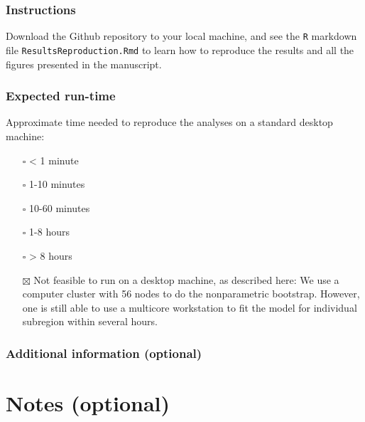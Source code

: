 \documentclass[
]{article}
\providecommand{\tightlist}{%
  \setlength{\itemsep}{0pt}\setlength{\parskip}{0pt}}
\begin{document}
\subsubsection{Instructions}\label{instructions}

Download the Github repository to your local machine, and see the
\texttt{R} markdown file \texttt{ResultsReproduction.Rmd} to learn how
to reproduce the results and all the figures presented in the
manuscript.

\subsubsection{Expected run-time}\label{expected-run-time}

Approximate time needed to reproduce the analyses on a standard desktop
machine:

\begin{itemize}
\tightlist
\item[$\square$]
  \textless{} 1 minute
\item[$\square$]
  1-10 minutes
\item[$\square$]
  10-60 minutes
\item[$\square$]
  1-8 hours
\item[$\square$]
  \textgreater{} 8 hours
\item[$\boxtimes$]
  Not feasible to run on a desktop machine, as described here: We use a
  computer cluster with 56 nodes to do the nonparametric bootstrap.
  However, one is still able to use a multicore workstation to fit the
  model for individual subregion within several hours.
\end{itemize}

\subsubsection{Additional information
(optional)}\label{additional-information-optional-2}

\section{Notes (optional)}\label{notes-optional}
\end{document}
